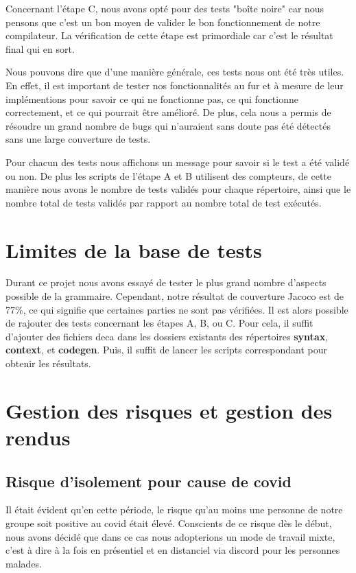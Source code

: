 \documentclass[12pt, a4paper, one side]{article}
\begin{document}
\begin{flushleft}
Concernant l'étape C, nous avons opté pour des tests "boîte noire" car nous pensons que c'est un bon moyen de valider le bon fonctionnement de notre compilateur. La vérification de cette étape est primordiale car c'est le résultat final qui en sort.
\end{flushleft}
\begin{flushleft}
Nous pouvons dire que d'une manière générale, ces tests nous ont été très utiles. En effet, il est important de tester nos fonctionnalités au fur et à mesure de leur implémentions pour savoir ce qui ne fonctionne pas, ce qui fonctionne correctement, et ce qui pourrait être amélioré. De plus, cela nous a permis de résoudre un grand nombre de bugs qui n'auraient sans doute pas été détectés sans une large couverture de tests.
\end{flushleft}
\begin{flushleft}
Pour chacun des tests nous affichons un message pour savoir si le test a été validé ou non. De plus les scripts de l'étape A et B utilisent des compteurs, de cette manière nous avons le nombre de tests validés pour chaque répertoire, ainsi que le nombre total de tests validés par rapport au nombre total de test exécutés.
\end{flushleft}

\section{Limites de la base de tests}
Durant ce projet nous avons essayé de tester le plus grand nombre d'aspects possible de la grammaire. Cependant, notre résultat de couverture Jacoco est de 77\%, ce qui signifie que certaines parties ne sont pas vérifiées. Il est alors possible de rajouter des tests concernant les étapes A, B, ou C. Pour cela, il suffit d'ajouter des fichiers deca dans les dossiers existants des répertoires \textbf{syntax}, \textbf{context}, et \textbf{codegen}. Puis, il suffit de lancer les scripts correspondant pour obtenir les résultats.

\section{Gestion des risques et gestion des rendus}
\subsection{Risque d'isolement pour cause de covid}
Il était évident qu'en cette période, le risque qu'au moins une personne de notre groupe soit positive au covid était élevé. Conscients de ce risque dès le début, nous avons décidé que dans ce cas nous adopterions un mode de travail mixte, c'est à dire à la fois en présentiel et en distanciel via discord pour les personnes malades.
\end{document}
